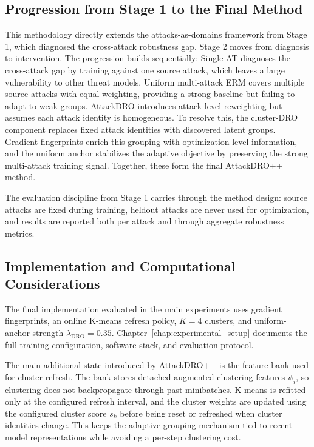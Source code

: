 \subsection{Progression from Stage 1 to the Final Method}

This methodology directly extends the attacks-as-domains framework from Stage 1,
which diagnosed the cross-attack robustness gap. Stage 2 moves from diagnosis to
intervention. The progression builds sequentially: Single-AT diagnoses the cross-attack
gap by training against one source attack, which leaves a large vulnerability to other
threat models. Uniform multi-attack ERM covers multiple source attacks with equal
weighting, providing a strong baseline but failing to adapt to weak groups. AttackDRO
introduces attack-level reweighting but assumes each attack identity is homogeneous.
To resolve this, the cluster-DRO component replaces fixed attack identities with
discovered latent groups. Gradient fingerprints enrich this grouping with
optimization-level information, and the uniform anchor stabilizes the adaptive objective
by preserving the strong multi-attack training signal. Together, these form the
final AttackDRO++ method.

The evaluation discipline from Stage 1 carries through the method design: source attacks are
fixed during training, heldout attacks are never used for optimization, and results are
reported both per attack and through aggregate robustness metrics.

\subsection{Implementation and Computational Considerations}

The final implementation evaluated in the main experiments uses gradient
fingerprints, an online K-means refresh policy, \(K=4\) clusters, and
uniform-anchor strength \(\lambda_{\mathrm{DRO}}=0.35\). Chapter~\ref{chap:experimental_setup}
documents the full training configuration, software stack, and evaluation protocol.

The main additional state introduced by AttackDRO++ is the feature bank used for
cluster refresh. The bank stores detached augmented clustering features \(\psi_i\),
so clustering does not backpropagate through past minibatches. K-means is refitted
only at the configured refresh interval, and the cluster weights are updated using
the configured cluster score \(s_k\) before being reset or refreshed when cluster
identities change. This keeps the adaptive grouping mechanism tied to recent model
representations while avoiding a per-step clustering cost.

